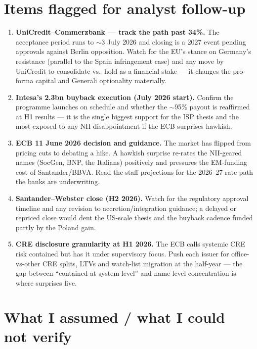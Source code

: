 \documentclass[10pt,a4paper]{article}
\begin{document}
\section{Items flagged for analyst follow-up}

\begin{enumerate}
\item \textbf{UniCredit--Commerzbank --- track the path past 34\%.} The acceptance period runs to $\sim$3 July 2026 and closing is a 2027 event pending approvals against Berlin opposition. Watch for the EU's stance on Germany's resistance (parallel to the Spain infringement case) and any move by UniCredit to consolidate vs.\ hold as a financial stake --- it changes the pro-forma capital and Generali optionality materially.

\item \textbf{Intesa's \texteuro2.3bn buyback execution (July 2026 start).} Confirm the programme launches on schedule and whether the $\sim$95\% payout is reaffirmed at H1 results --- it is the single biggest support for the ISP thesis and the most exposed to any NII disappointment if the ECB surprises hawkish.

\item \textbf{ECB 11 June 2026 decision and guidance.} The market has flipped from pricing cuts to debating a hike. A hawkish surprise re-rates the NII-geared names (SocGen, BNP, the Italians) positively and pressures the EM-funding cost of Santander/BBVA. Read the staff projections for the 2026--27 rate path the banks are underwriting.

\item \textbf{Santander--Webster close (H2 2026).} Watch for the regulatory approval timeline and any revision to accretion/integration guidance; a delayed or repriced close would dent the US-scale thesis and the buyback cadence funded partly by the Poland gain.

\item \textbf{CRE disclosure granularity at H1 2026.} The ECB calls systemic CRE risk contained but has it under supervisory focus. Push each issuer for office-vs-other CRE splits, LTVs and watch-list migration at the half-year --- the gap between ``contained at system level'' and name-level concentration is where surprises live.
\end{enumerate}

\section{What I assumed / what I could not verify}
\end{document}
